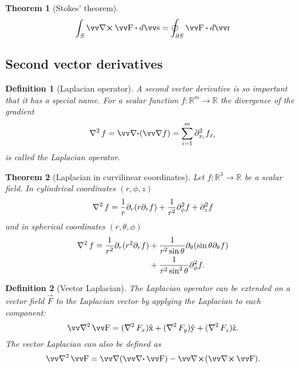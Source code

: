 \documentclass[margin=small]{tex/hsrzf}
\theoremstyle{elmagzf}
\newtheorem{theorem}{Theorem}
\newtheorem{definition}{Definition}
\begin{document}
\begin{theorem}[Stokes' theorem]
  \[
    \int_S \curl \vec{F} \dotp d\vec{s}
    = \oint_{\partial S} \vec{F} \dotp d\vec{r}
  \]
\end{theorem}

\subsection{Second vector derivatives}

\begin{definition}[Laplacian operator]
  A second vector derivative is so important that it has a special name.  For a
  scalar function \(f: \mathbb{R}^m \to \mathbb{R}\) the divergence of the
  gradient
  \[
    \laplacian f = \div (\grad f) = \sum_{i=1}^m \partial_{x_i}^2 f_{x_i}
  \]
  is called the \emph{Laplacian operator}.
\end{definition}

\begin{theorem}[Laplacian in curvilinear coordinates]
  Let \(f: \mathbb{R}^3 \to \mathbb{R}\) be a scalar field. In cylindrical
  coordinates \((r,\phi,z)\)
  \[
    \operatorname{\nabla^2} f = \frac{1}{r} \partial_r (r \partial_r f)
      + \frac{1}{r^2} \partial_\phi^2 f
      + \partial_z^2 f
  \]
  and in spherical coordinates \((r,\theta,\phi)\)
  \begin{align*}
    \operatorname{\nabla^2} f = 
      \frac{1}{r^2} \partial_r ( r^2 \partial_r f)
      & + \frac{1}{r^2\sin\theta} \partial_\theta (\sin\theta \partial_\theta f) \\
      & + \frac{1}{r^2 \sin^2 \theta} \partial_\phi^2 f.
  \end{align*}
\end{theorem}

\begin{definition}[Vector Laplacian]
  The Laplacian operator can be extended on a vector field \(\vec{F}\) to the 
  \emph{Laplacian vector} by applying the Laplacian to each component:
  \[
    \vlaplacian \vec{F} 
      = (\laplacian F_x)\uvec{x} 
      + (\laplacian F_y)\uvec{y} 
      + (\laplacian F_z)\uvec{z} .
  \]
  The vector Laplacian can also be defined as
  \[
    \vlaplacian \vec{F} = \grad (\div \vec{F}) - \curl (\curl \vec{F}).
  \]
\end{definition}
\end{document}
